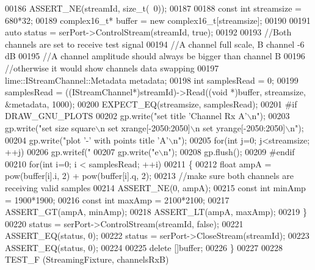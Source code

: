 \begin{DoxyCode}
{00186     ASSERT\_NE(streamId, \textcolor{keywordtype}{size\_t}(~0));
00187 
00188     \textcolor{keyword}{const} \textcolor{keywordtype}{int} streamsize = 680*32;
00189     complex16_t* buffer = \textcolor{keyword}{new} complex16_t[streamsize];
00190 
00191     \textcolor{keyword}{auto} status = serPort->ControlStream(streamId, \textcolor{keyword}{true});
00192 
00193     \textcolor{comment}{//Both channels are set to receive test signal}
00194     \textcolor{comment}{//A channel full scale, B channel -6 dB}
00195     \textcolor{comment}{//A channel amplitude should always be bigger than channel B}
00196     \textcolor{comment}{//otherwise it would show channels data swapping}
00197     lime::IStreamChannel::Metadata metadata;
00198     \textcolor{keywordtype}{int} samplesRead = 0;
00199     samplesRead = ((IStreamChannel*)streamId)->Read((\textcolor{keywordtype}{void} *)buffer, streamsize, &metadata, 1000);
00200     EXPECT\_EQ(streamsize, samplesRead);
00201 \textcolor{preprocessor}{#if DRAW\_GNU\_PLOTS}
00202     gp.write(\textcolor{stringliteral}{"set title 'Channel Rx A'\(\backslash\)n"});
00203     gp.write(\textcolor{stringliteral}{"set size square\(\backslash\)n set xrange[-2050:2050]\(\backslash\)n set yrange[-2050:2050]\(\backslash\)n"});
00204     gp.write(\textcolor{stringliteral}{"plot '-' with points title 'A'\(\backslash\)n"});
00205     \textcolor{keywordflow}{for}(\textcolor{keywordtype}{int} j=0; j<streamsize; ++j)
00206         gp.writef(\textcolor{stringliteral}{"%
00207     gp.write(\textcolor{stringliteral}{"e\(\backslash\)n"});
00208     gp.flush();
00209 \textcolor{preprocessor}{#endif}
00210     \textcolor{keywordflow}{for}(\textcolor{keywordtype}{int} i=0; i < samplesRead; ++i)
00211     \{
00212         \textcolor{keywordtype}{float} ampA = pow(buffer[i].i, 2) + pow(buffer[i].q, 2);
00213         \textcolor{comment}{//make sure both channels are receiving valid samples}
00214         ASSERT\_NE(0, ampA);
00215         \textcolor{keyword}{const} \textcolor{keywordtype}{int} minAmp = 1900*1900;
00216         \textcolor{keyword}{const} \textcolor{keywordtype}{int} maxAmp = 2100*2100;
00217         ASSERT\_GT(ampA, minAmp);
00218         ASSERT\_LT(ampA, maxAmp);
00219     \}
00220     status = serPort->ControlStream(streamId, \textcolor{keyword}{false});
00221     ASSERT\_EQ(status, 0);
00222     status = serPort->CloseStream(streamId);
00223     ASSERT\_EQ(status, 0);
00224 
00225     \textcolor{keyword}{delete} []buffer;
00226 \}
00227 
00228 TEST_F (StreamingFixture, channelsRxB)
}}
\end{DoxyCode}
